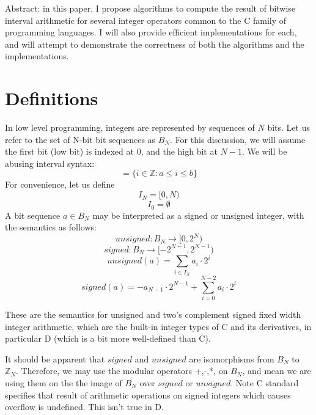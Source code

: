\documentclass{article}
\begin{document}
Abstract: in this paper, I propose algorithms to compute the result of 
bitwise interval arithmetic for several integer operators common to the 
C family of programming languages.  I will also provide efficient 
implementations for each, and will attempt to demonstrate the correctness 
of both the algorithms and the implementations.

\section{Definitions}

In low level programming, integers are represented by sequences of $N$ 
bits. Let us refer to the set of N-bit bit sequences as $B_N$. 
For this discussion, we will assume the first bit (low bit) 
is indexed at $0$, and 
the high bit at $N-1$. We will be abusing interval syntax:
\begin{equation*} 
[a,b] = \{i \in \mathbb{Z} : a \le i \le b\}
\end{equation*}
For convenience, let us define
\begin{equation*}
I_N = [0, N)
\end{equation*}
\begin{equation*}
I_0 = \emptyset
\end{equation*}
A bit sequence $a \in B_N$ may be interpreted as a signed or unsigned 
integer, with the semantics as follows:
\begin{equation}\label{unsf} 
unsigned : B_N \rightarrow [0,2^N)
\end{equation}
\begin{equation}\label{sgnf} 
signed : B_N \rightarrow [-2^{N-1},2^{N-1})
\end{equation}
\begin{equation}\label{unsdef} 
unsigned(a) = \sum_{i\in I_N} {a_i} \cdot 2^i
\end{equation}
\begin{equation}\label{sgndef} 
signed(a) = - a_{N-1} \cdot 2^{N-1} + \sum_{i = 0}^{N-2} {a_i} \cdot 2^i
\end{equation}

These are the semantics for unsigned and two's complement signed fixed width 
integer arithmetic, which are the built-in integer types of C and its 
derivatives, in particular D (which is a bit more well-defined than C).

\vspace{10pt}
It should be apparent that $signed$ and $unsigned$ are isomorphisms from 
$B_N$ to $\mathbb{Z}_N$.  Therefore, we may use the modular operators +,-,*, 
on $B_N$, and mean we are using them on the the image of $B_N$ over
$signed$ or $unsigned$.  Note C standard specifies that result of 
arithmetic operations on signed integers which causes overflow is undefined. 
This isn't true in D.
\end{document}
